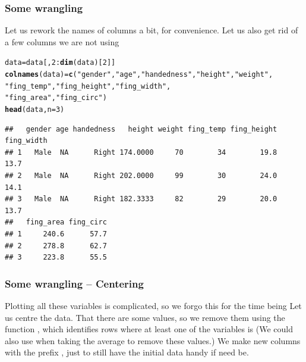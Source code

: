 \documentclass[aspectratio=169]{beamer}\usepackage[]{graphicx}\usepackage[]{xcolor}
\makeatletter
\newcommand{\hlnum}[1]{\textcolor[rgb]{0.686,0.059,0.569}{#1}}%
\newcommand{\hlstr}[1]{\textcolor[rgb]{0.192,0.494,0.8}{#1}}%
\newcommand{\hlopt}[1]{\textcolor[rgb]{0,0,0}{#1}}%
\newcommand{\hlstd}[1]{\textcolor[rgb]{0.345,0.345,0.345}{#1}}%
\newcommand{\hlkwb}[1]{\textcolor[rgb]{0.69,0.353,0.396}{#1}}%
\newcommand{\hlkwc}[1]{\textcolor[rgb]{0.333,0.667,0.333}{#1}}%
\newcommand{\hlkwd}[1]{\textcolor[rgb]{0.737,0.353,0.396}{\textbf{#1}}}%
\newenvironment{kframe}{%
 \def\at@end@of@kframe{}%
 \ifinner\ifhmode%
  \def\at@end@of@kframe{\end{minipage}}%
  \begin{minipage}{\columnwidth}%
 \fi\fi%
 \def\FrameCommand##1{\hskip\@totalleftmargin \hskip-\fboxsep
 \colorbox{shadecolor}{##1}\hskip-\fboxsep
     \hskip-\linewidth \hskip-\@totalleftmargin \hskip\columnwidth}%
 \MakeFramed {\advance\hsize-\width
   \@totalleftmargin\z@ \linewidth\hsize
   \@setminipage}}%
 {\par\unskip\endMakeFramed%
 \at@end@of@kframe}
\newenvironment{knitrout}{}{} %
\makeatother
\begin{document}
\begin{frame}[fragile]\frametitle{Some wrangling}
Let us rework the names of columns a bit, for convenience. Let us also get rid of a few columns we are not using
\vfill
\begin{knitrout}
\color{fgcolor}\begin{kframe}
\begin{alltt}
\hlstd{data} \hlkwb{=} \hlstd{data[,}\hlnum{2}\hlopt{:}\hlkwd{dim}\hlstd{(data)[}\hlnum{2}\hlstd{]]}
\hlkwd{colnames}\hlstd{(data)} \hlkwb{=} \hlkwd{c}\hlstd{(}\hlstr{"gender"}\hlstd{,} \hlstr{"age"}\hlstd{,} \hlstr{"handedness"}\hlstd{,} \hlstr{"height"}\hlstd{,} \hlstr{"weight"}\hlstd{,}
                  \hlstr{"fing_temp"}\hlstd{,} \hlstr{"fing_height"}\hlstd{,} \hlstr{"fing_width"}\hlstd{,}
                  \hlstr{"fing_area"}\hlstd{,} \hlstr{"fing_circ"}\hlstd{)}
\hlkwd{head}\hlstd{(data,} \hlkwc{n}\hlstd{=}\hlnum{3}\hlstd{)}
\end{alltt}
\begin{verbatim}
##   gender age handedness   height weight fing_temp fing_height fing_width
## 1   Male  NA      Right 174.0000     70        34        19.8       13.7
## 2   Male  NA      Right 202.0000     99        30        24.0       14.1
## 3   Male  NA      Right 182.3333     82        29        20.0       13.7
##   fing_area fing_circ
## 1     240.6      57.7
## 2     278.8      62.7
## 3     223.8      55.5
\end{verbatim}
\end{kframe}
\end{knitrout}
\end{frame}



\begin{frame}\frametitle{Some wrangling -- Centering}
Plotting all these variables is complicated, so we forgo this for the time being
\vfill
Let us centre the data. That there are some  values, so we remove them using the function , which identifies rows where at least one of the variables is 
\vfill
(We could also use  when taking the average to remove these values.) 
\vfill
We make new columns with the prefix , just to still have the initial data handy if need be.
\end{frame}
\end{document}
